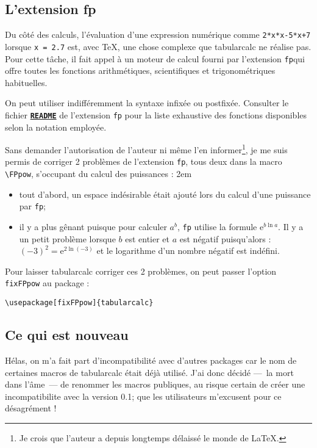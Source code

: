 \documentclass[a4paper,10pt]{article}
\newcommand\tbcalc{\textsf{tabularcalc}\xspace}
\newcommand\mywidth{0.85\linewidth}
\begin{document}
\subsection{L'extension \ttfamily fp}
Du côté des calculs, l'évaluation d'une expression numérique comme \verb|2*x*x-5*x+7| lorsque \hbox{\verb|x = 2.7|} est, avec \TeX{}, une chose complexe que \tbcalc ne réalise pas. Pour cette tâche, il fait appel à un moteur de calcul fourni par l'extension \og\verb=fp=\fg qui offre toutes les fonctions arithmétiques, scientifiques et trigonométriques habituelles.\medskip

On peut utiliser indifféremment la syntaxe infixée ou postfixée. Consulter le fichier \href{http://www.ctan.org/get/macros/latex/contrib/fp/README}{\texttt{\textbf{README}}} de l'extension \verb=fp= pour la liste exhaustive des fonctions disponibles selon la notation employée.\medskip

Sans demander l'autorisation de l'auteur ni même l'en informer\footnote{Je crois que l'auteur a depuis longtemps délaissé le monde de \LaTeX{}.}, je me suis permis de corriger 2 problèmes de l'extension \verb=fp=, tous deux dans la macro \verb=\FPpow=, s'occupant du calcul des puissances :
\parindent2em
\begin{itemize}
	\item tout d'abord, un espace indésirable était ajouté lors du calcul d'une puissance par \verb=fp=;
	\item il y a plus gênant puisque pour calculer $a^b$, \verb=fp= utilise la formule $\mathrm{e}^{b\ln a}$. Il y a un petit problème lorsque $b$ est entier et $a$ est négatif puisqu'alors : $(-3)^2=\mathrm{e}^{2\ln(-3)}$ et le logarithme d'un nombre négatif est indéfini.
\end{itemize}\smallskip

\parindent0pt
Pour laisser \tbcalc corriger ces 2 problèmes, on peut passer l'option \og\verb=fixFPpow=\fg{} au package :
\begin{center}
\begin{minipage}{\mywidth}
\begin{lstlisting}
\usepackage[fixFPpow]{tabularcalc}
\end{lstlisting}
\end{minipage}
\end{center}

\subsection{Ce qui est nouveau}
Hélas, on m'a fait part d'incompatibilité avec d'autres packages car le nom de certaines macros de \tbcalc était déjà utilisé. J'ai donc décidé ---~la mort dans l'âme~--- de renommer les macros publiques, au risque certain de créer une incompatibilite avec la version 0.1; que les utilisateurs m'excusent pour ce désagrément !
\end{document}
